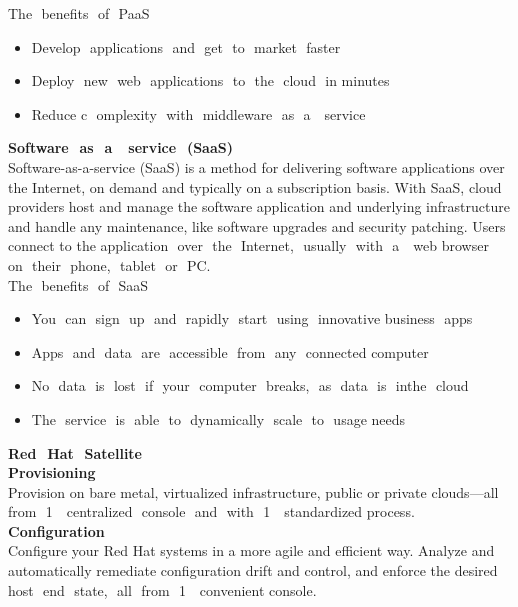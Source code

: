 \documentclass[a4paper,12pt]{report}
\begin{document}
The​ ​ benefits​ ​ of​ ​ PaaS
\begin{itemize}
	\item Develop​ ​ applications​ ​ and​ ​ get​ ​ to​ ​ market​ ​ faster
	\item Deploy​ ​ new​ ​ web​ ​ applications​ ​ to​ ​ the​ ​ cloud​ ​ in​ ​ minutes
	\item Reduce​ c ​ omplexity​ ​ with​ ​ middleware​ ​ as​ ​ a ​ ​ service\\
\end{itemize}
\textbf{Software​ ​ as​ ​ a ​ ​ service​ ​ (SaaS)}\\
Software-as-a-service (SaaS) is a method for delivering software applications over the
Internet, on demand and typically on a subscription basis. With SaaS, cloud providers host
and manage the software application and underlying infrastructure and handle any
maintenance, like software upgrades and security patching. Users connect to the
application​ ​ over​ ​ the​ ​ Internet,​ ​ usually​ ​ with​ ​ a ​ ​ web​ ​ browser​ ​ on​ ​ their​ ​ phone,​ ​ tablet​ ​ or​ ​ PC.\\
The​ ​ benefits​ ​ of​ ​ SaaS
\begin{itemize}
	\item You​ ​ can​ ​ sign​ ​ up​ ​ and​ ​ rapidly​ ​ start​ ​ using​ ​ innovative​ ​ business​ ​ apps
	\item Apps​ ​ and​ ​ data​ ​ are​ ​ accessible​ ​ from​ ​ any​ ​ connected​ ​ computer
	\item No​ ​ data​ ​ is​ ​ lost​ ​ if​ ​ your​ ​ computer​ ​ breaks,​ ​ as​ ​ data​ ​ is​ ​ in​ ​ the​ ​ cloud
	\item The​ ​ service​ ​ is​ ​ able​ ​ to​ ​ dynamically​ ​ scale​ ​ to​ ​ usage​ ​ needs\\
\end{itemize} 
\textbf{\large{Red​ ​ Hat​ ​ Satellite}} \\
\newline
\textbf{Provisioning}\\
Provision on bare metal, virtualized infrastructure, public or private
clouds—all​ ​ from​ ​ 1 ​ ​ centralized​ ​ console​ ​ and​ ​ with​ ​ 1 ​ ​ standardized​ ​ process.\\
\newline
\textbf{Configuration}\\
Configure your Red Hat systems in a more agile and efficient way. Analyze
and automatically remediate configuration drift and control, and enforce the
desired​ ​ host​ ​ end​ ​ state,​ ​ all​ ​ from​ ​ 1 ​ ​ convenient​ ​ console.\\
\end{document}

